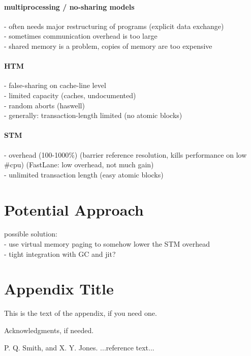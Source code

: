 \documentclass{sigplanconf}
\begin{document}
\paragraph{multiprocessing / no-sharing models}

- often needs major restructuring of programs (explicit data exchange)\\
- sometimes communication overhead is too large\\
- shared memory is a problem, copies of memory are too expensive

\paragraph{HTM}

- false-sharing on cache-line level\\
- limited capacity (caches, undocumented)\\
- random aborts (haswell)\\
- generally: transaction-length limited (no atomic blocks)

\paragraph{STM}

- overhead (100-1000\%) (barrier reference resolution, kills performance on low \#cpu)
(FastLane: low overhead, not much gain)\\
- unlimited transaction length (easy atomic blocks)

\section{Potential Approach}
possible solution:\\
- use virtual memory paging to somehow lower the STM overhead\\
- tight integration with GC and jit?


\appendix
\section{Appendix Title}

This is the text of the appendix, if you need one.

\acks

Acknowledgments, if needed.





\begin{thebibliography}{}
\softraggedright

P. Q. Smith, and X. Y. Jones. ...reference text...

\end{thebibliography}
\end{document}
